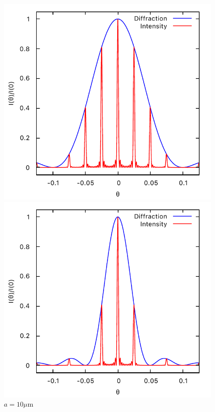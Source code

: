 \documentclass[11pt, twoside]{article}   	%
\theoremstyle{plain}
\theoremstyle{definition}
\begin{document}
\begin{description}
\begin{figure}[htbp]
		\begin{minipage}[t]{0.33\linewidth}
		\centering
		\includegraphics[width=0.9\linewidth]{a=5}
		\caption{$a=5\mu\mathrm{m}$}
		\end{minipage}
		\begin{minipage}[t]{0.33\linewidth}
		\centering
		\includegraphics[width=0.9\linewidth]{a=10}
		\caption{$a=10\mu\mathrm{m}$}
		\end{minipage}

\end{figure}
\end{description}
\end{document}
